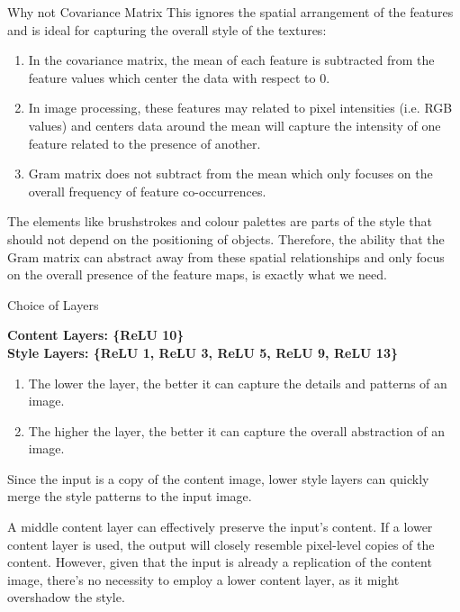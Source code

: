 \documentclass[final]{beamer}
\newlength{\colwidth}
\begin{document}
\begin{frame}[t]
\begin{columns}[t]
\begin{column}{\colwidth}
\begin{alertblock}{Why not Covariance Matrix}
    This ignores the spatial arrangement of the features and is ideal for capturing the overall style of the textures:

    \begin{enumerate}
        \item In the covariance matrix, the mean of each feature is subtracted from the feature values which center the data with respect to 0.
        \item In image processing, these features may related to pixel intensities (i.e. RGB values) and centers data around the mean will capture the intensity of one feature related to the presence of another.
        \item Gram matrix does not subtract from the mean which only focuses on the overall frequency of feature co-occurrences.
    \end{enumerate}

    The elements like brushstrokes and colour palettes are parts of the style that should not depend on the positioning of objects. Therefore, the ability that the Gram matrix can abstract away from these spatial relationships and only focus on the overall presence of the feature maps, is exactly what we need.

  \end{alertblock}

  \begin{exampleblock}{Choice of Layers}

    \textbf{Content Layers: \{ReLU 10\}}\\
    
    \textbf{Style Layers: \{ReLU 1, ReLU 3, ReLU 5, ReLU 9, ReLU 13\}}

    \begin{enumerate}
        \item The lower the layer, the better it can capture the details and patterns of an image.
        \item The higher the layer, the better it can capture the overall abstraction of an image.
    \end{enumerate}

    Since the input is a copy of the content image, lower style layers can quickly merge the style patterns to the input image.

    A middle content layer can effectively preserve the input's content. If a lower content layer is used, the output will closely resemble pixel-level copies of the content. However, given that the input is already a replication of the content image, there's no necessity to employ a lower content layer, as it might overshadow the style.


\end{exampleblock}
\end{column}
\end{columns}
\end{frame}
\end{document}
